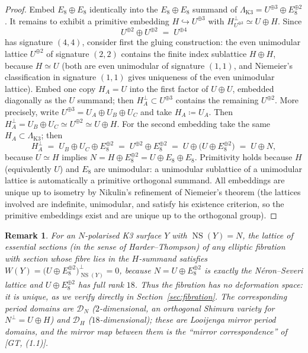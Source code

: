 \documentclass[11pt]{article}
\newtheorem{remark}[theorem]{Remark}
\DeclareMathOperator{\NS}{NS}
\begin{document}
\begin{proof}
Embed $E_8\oplus E_8$ identically into the $E_8\oplus E_8$ summand of
$\Lambda_{\mathrm{K3}}=U^{\oplus3}\oplus E_8^{\oplus2}$. It remains to
exhibit a primitive embedding $H\hookrightarrow U^{\oplus 3}$ with
$H^{\perp}_{U^{\oplus3}}\simeq U\oplus H$. Since
\[
U^{\oplus 2}\oplus U^{\oplus 2}\;=\;U^{\oplus 4}
\]
has signature $(4,4)$, consider first the gluing construction: the even
unimodular lattice $U^{\oplus2}$ of signature $(2,2)$ contains the finite
index sublattice $H\oplus H$, because $H\simeq U$ (both are even unimodular
of signature $(1,1)$, and Niemeier's classification in signature $(1,1)$
gives uniqueness of the even unimodular lattice). Embed one copy $H_A=U$
into the first factor of $U\oplus U$, embedded diagonally as the $U$
summand; then $H_A^{\perp}\subset U^{\oplus3}$ contains the remaining
$U^{\oplus2}$. More precisely, write
$U^{\oplus3}=U_A\oplus U_B\oplus U_C$ and take
$H_A \coloneqq U_A$. Then
$H_A^{\perp}=U_B\oplus U_C\simeq U^{\oplus2}\simeq U\oplus H$.
For the second embedding take the same $H_A\subset\Lambda_{\mathrm{K3}}$;
then
\[
H_A^{\perp}\;=\;U_B\oplus U_C\oplus E_8^{\oplus2}
\;=\;U^{\oplus 2}\oplus E_8^{\oplus2}
\;=\;U\oplus\bigl(U\oplus E_8^{\oplus 2}\bigr)
\;=\;U\oplus N,
\]
because $U\simeq H$ implies
$N=H\oplus E_8^{\oplus2}=U\oplus E_8\oplus E_8$.
Primitivity holds because $H$ (equivalently $U$) and $E_8$ are unimodular:
a unimodular sublattice of a unimodular lattice is automatically a primitive
orthogonal summand. All embeddings are unique up to isometry by Nikulin's
refinement of Niemeier's theorem (the lattices involved are indefinite,
unimodular, and satisfy his existence criterion, so the primitive embeddings
exist and are unique up to the orthogonal group).
\end{proof}

\begin{remark}\label{rem:W}
For an $N$-polarised K3 surface $Y$ with $\NS(Y)=N$, the lattice of essential
sections (in the sense of Harder--Thompson) of any elliptic fibration with
section whose fibre lies in the $H$-summand satisfies
$W(Y)=\bigl(U\oplus E_8^{\oplus 2}\bigr)^{\perp}_{\NS(Y)}=0$,
because $N=U\oplus E_8^{\oplus2}$ is exactly the N\'eron--Severi lattice and
$U\oplus E_8^{\oplus2}$ has full rank $18$. Thus the fibration has no
deformation space: it is unique, as we verify directly in
Section~\ref{sec:fibration}. The corresponding period domains are
$\mathcal D_N$ ($2$-dimensional, an orthogonal Shimura variety for
$N^{\perp}=U\oplus H$) and $\mathcal D_H$ ($18$-dimensional); these are
Looijenga mirror period domains, and the mirror map between them is the
``mirror correspondence'' of [GT, (1.1)].
\end{remark}
\end{document}
